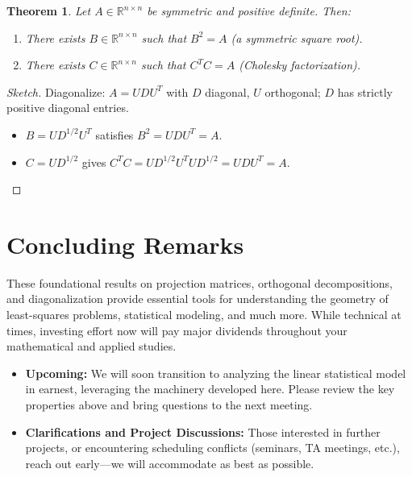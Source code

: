 \documentclass[12pt]{article}
\theoremstyle{definition}
\theoremstyle{plain}
\newtheorem{theorem}[definition]{Theorem}
\theoremstyle{remark}
\begin{document}
\begin{theorem}
    Let $A \in \mathbb{R}^{n \times n}$ be symmetric and positive definite. Then:
    \begin{enumerate}
        \item There exists $B \in \mathbb{R}^{n \times n}$ such that $B^2 = A$ (a symmetric square root).
        \item There exists $C \in \mathbb{R}^{n \times n}$ such that $C^T C = A$ (Cholesky factorization).
    \end{enumerate}
\end{theorem}

\begin{proof}[Sketch]
    Diagonalize: $A = U D U^T$ with $D$ diagonal, $U$ orthogonal; $D$ has strictly positive diagonal entries.
    \begin{itemize}
        \item $B = U D^{1/2} U^T$ satisfies $B^2 = U D U^T = A$.
        \item $C = U D^{1/2}$ gives $C^T C = U D^{1/2} U^T U D^{1/2} = U D U^T = A$.
    \end{itemize}
\end{proof}

\section{Concluding Remarks}

These foundational results on projection matrices, orthogonal decompositions, and diagonalization provide essential tools for understanding the geometry of least-squares problems, statistical modeling, and much more. While technical at times, investing effort now will pay major dividends throughout your mathematical and applied studies.

\begin{administrativenote}
    \begin{itemize}
        \item \textbf{Upcoming:} We will soon transition to analyzing the linear statistical model in earnest, leveraging the machinery developed here. Please review the key properties above and bring questions to the next meeting.
        \item \textbf{Clarifications and Project Discussions:} Those interested in further projects, or encountering scheduling conflicts (seminars, TA meetings, etc.), reach out early---we will accommodate as best as possible.
    \end{itemize}
\end{administrativenote}
\end{document}
